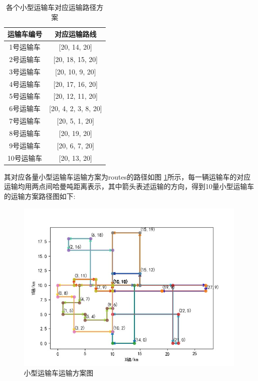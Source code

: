 \documentclass{whutmod}
\begin{document}
  	\begin{table}[H]

  	\centering		
  	\caption{各个小型运输车对应运输路径方案}\label{zhuansassgzai}
  	\begin{tabular}{cc}
  		\toprule[2pt]
  		\multicolumn{1}{m{5cm}}{\centering 运输车编号}
  		& \multicolumn{1}{m{5cm}}{\centering 对应运输路线}
  		\\
  		\midrule[1pt]
  		1号运输车 &  [20, 14, 20] \\ 
  		2号运输车 &  [20, 18, 15, 20] \\ 
  		3号运输车 &  [20, 10, 9, 20] \\ 
  		4号运输车 &  [20, 17, 16, 20] \\ 
  		5号运输车 &   [20, 12, 11, 20]\\ 
  		6号运输车 & [20, 4, 2, 3, 8, 20] \\ 
  		7号运输车 & [20, 5, 1, 20] \\ 
  		8号运输车 &  [20, 19, 20] \\ 
  		9号运输车 &   [20, 6, 7, 20] \\ 
  		10号运输车 & [20, 13, 20] \\
  		\bottomrule[2pt]	
  	\end{tabular}
  \end{table}
  
  其对应各量小型运输车运输方案为routes的路径如图 \ref{ssssssss}所示，每一辆运输车的对应运输均用两点间哈曼吨距离表示，其中箭头表述运输的方向，得到10量小型运输车的运输方案路径图如下:
  
  \begin{figure}[H]
  	\centering
  	\includegraphics[width=\textwidth]{figures/22.jpg}
  	\caption{小型运输车运输方案图}\label{ssssssss}
  \end{figure}
\end{document}

